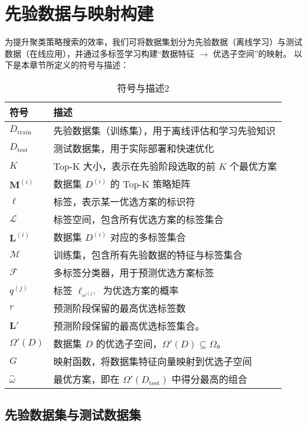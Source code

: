 \documentclass[8pt,twocolumn]{article} %
\numberwithin{equation}{section}
\begin{document}
\section{先验数据与映射构建}
为提升聚类策略搜索的效率，我们可将数据集划分为先验数据（离线学习）与测试数据（在线应用），并通过多标签学习构建“数据特征 \(\to\) 优选子空间”的映射。
以下是本章节所定义的符号与描述：

\begin{table}[ht]
\centering
\caption{符号与描述2}
\label{tab:symbols-advanced}
\begin{tabular}{ll}
\toprule
\textbf{符号} & \textbf{描述} \\
\midrule
$D_{\text{train}}$ & 先验数据集（训练集），用于离线评估和学习先验知识 \\
$D_{\text{test}}$ & 测试数据集，用于实际部署和快速优化 \\
$K$ & Top-K 大小，表示在先验阶段选取的前 $K$ 个最优方案 \\
$\mathbf{M}^{(i)}$ & 数据集 $D^{(i)}$ 的 Top-K 策略矩阵 \\
$\ell$ & 标签，表示某一优选方案的标识符 \\
$\mathcal{L}$ & 标签空间，包含所有优选方案的标签集合 \\
$\mathbf{L}^{(i)}$ & 数据集 $D^{(i)}$ 对应的多标签集合 \\
$\mathcal{M}$ & 训练集，包含所有先验数据的特征与标签集合 \\
$\mathcal{F}$ & 多标签分类器，用于预测优选方案标签 \\
$q^{(j)}$ & 标签 $\ell_{\omega^{(j)}}$ 为优选方案的概率 \\
$r$ & 预测阶段保留的最高优选标签数 \\
$\mathbf{L}'$ & 预测阶段保留的最高优选标签集合。 \\
$\Omega'(D)$ & 数据集 $D$ 的优选子空间，$\Omega'(D) \subseteq \Omega$。 \\
$G$ & 映射函数，将数据集特征向量映射到优选子空间 \\
$\hat{\omega}$ & 最优方案，即在 $\Omega'(D_{\text{test}})$ 中得分最高的组合 \\
\bottomrule
\end{tabular}
\end{table}

\subsection{先验数据集与测试数据集}
\label{subsec:Dtrain-Dtest}
\end{document}
